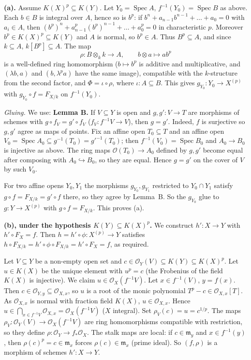 \documentclass[11pt]{article}
\begin{document}
\textbf{(a).} Assume $K(X)^p\subseteq K(Y)$. Let $Y_0=\operatorname{Spec}A$, $f^{-1}(Y_0)=\operatorname{Spec}B$ as above. Each $b\in B$ is integral over $A$, hence so is $b^p$: if $b^n+a_{n-1}b^{n-1}+\dots+a_0=0$ with $a_i\in A$, then $(b^p)^n+a_{n-1}^p(b^p)^{n-1}+\dots+a_0^p=0$ in characteristic $p$. Moreover $b^p\in K(X)^p\subseteq K(Y)$ and $A$ is normal, so $b^p\in A$. Thus $B^p\subseteq A$, and since $k\subseteq A$, $k[B^p]\subseteq A$. The map
\[ \rho:B\otimes_kk\to A,\qquad b\otimes a\mapsto ab^p \]
is a well-defined ring homomorphism ($b\mapsto b^p$ is additive and multiplicative, and $(\lambda b,a)$ and $(b,\lambda^pa)$ have the same image), compatible with the $k$-structure from the second factor, and $\Phi=\iota\circ\rho$, where $\iota:A\subseteq B$. This gives $g_{Y_0}:Y_0\to X^{(p)}$ with $g_{Y_0}\circ f=F_{X/k}$ on $f^{-1}(Y_0)$.

\emph{Gluing.} We use: \textbf{Lemma B.} If $V\subseteq Y$ is open and $g,g':V\to T$ are morphisms of schemes with $g\circ f_V=g'\circ f_V$ ($f_V:f^{-1}V\to V$), then $g=g'$. Indeed, $f$ is surjective so $g,g'$ agree as maps of points. Fix an affine open $T_0\subseteq T$ and an affine open $V_0=\operatorname{Spec}A_0\subseteq g^{-1}(T_0)=g'^{-1}(T_0)$; then $f^{-1}(V_0)=\operatorname{Spec}B_0$ and $A_0\to B_0$ is injective as above. The ring maps $\mathcal O(T_0)\to A_0$ defined by $g,g'$ become equal after composing with $A_0\hookrightarrow B_0$, so they are equal. Hence $g=g'$ on the cover of $V$ by such $V_0$.

For two affine opens $Y_0,Y_1$ the morphisms $g_{Y_0},g_{Y_1}$ restricted to $Y_0\cap Y_1$ satisfy $g\circ f=F_{X/k}=g'\circ f$ there, so they agree by Lemma~B. So the $g_{Y_0}$ glue to $g:Y\to X^{(p)}$ with $g\circ f=F_{X/k}$. This proves (a).

\textbf{(b), under the hypothesis $K(Y)\subseteq K(X)^p$.} We construct $h':X\to Y$ with $h'\circ F_X=f$. Then $h=h'\circ\phi:X^{(p)}\to Y$ satisfies $h\circ F_{X/k}=h'\circ\phi\circ F_{X/k}=h'\circ F_X=f$, as required.

Let $V\subseteq Y$ be a non-empty open set and $c\in\mathcal O_Y(V)\subseteq K(Y)\subseteq K(X)^p$. Let $u\in K(X)$ be the unique element with $u^p=c$ (the Frobenius of the field $K(X)$ is injective). We claim $u\in\mathcal O_X(f^{-1}V)$. Let $x\in f^{-1}(V)$, $y=f(x)$. Then $c\in\mathcal O_{Y,y}\subseteq\mathcal O_{X,x}$, so $u$ is a root of the monic polynomial $T^p-c\in\mathcal O_{X,x}[T]$. As $\mathcal O_{X,x}$ is normal with fraction field $K(X)$, $u\in\mathcal O_{X,x}$. Hence $u\in\bigcap_{x\in f^{-1}V}\mathcal O_{X,x}=\mathcal O_X(f^{-1}V)$ ($X$ integral). Set $\rho_V(c)=u=c^{1/p}$. The maps $\rho_V:\mathcal O_Y(V)\to\mathcal O_X(f^{-1}V)$ are ring homomorphisms compatible with restriction, so they define $\rho:\mathcal O_Y\to f_*\mathcal O_X$. The stalk maps are local: if $c\in\mathfrak m_y$ and $x\in f^{-1}(y)$, then $\rho(c)^p=c\in\mathfrak m_x$ forces $\rho(c)\in\mathfrak m_x$ (prime ideal). So $(f,\rho)$ is a morphism of schemes $h':X\to Y$.
\end{document}
